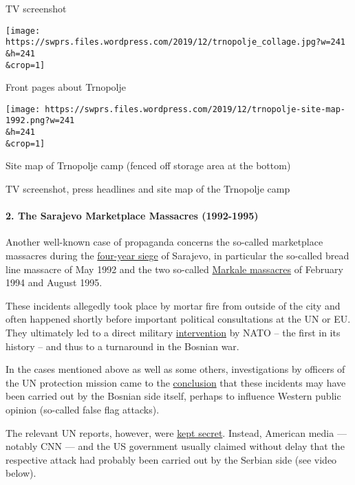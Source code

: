 TV screenshot

\href{https://swprs.files.wordpress.com/2019/12/trnopolje_collage.jpg}{}

\texttt{[image: https://swprs.files.wordpress.com/2019/12/trnopolje\_collage.jpg?w=241\\\&h=241\\\&crop=1]}

Front pages about Trnopolje

\href{https://swprs.files.wordpress.com/2019/12/trnopolje-site-map-1992.png}{}

\texttt{[image: https://swprs.files.wordpress.com/2019/12/trnopolje-site-map-1992.png?w=241\\\&h=241\\\&crop=1]}

Site map of Trnopolje camp (fenced off storage area at the bottom)

TV screenshot, press headlines and site map of the Trnopolje camp

\hypertarget{2-the-sarajevo-marketplace-massacres-1992-1995}{%
\paragraph{2. The Sarajevo Marketplace Massacres
(1992-1995)}\label{2-the-sarajevo-marketplace-massacres-1992-1995}}

Another well-known case of propaganda concerns the so-called marketplace
massacres during the
\href{https://en.wikipedia.org/wiki/Siege_of_Sarajevo}{four-year siege}
of Sarajevo, in particular the so-called bread line massacre of May 1992
and the two so-called
\href{https://en.wikipedia.org/wiki/Markale_massacres}{Markale
massacres} of February 1994 and August 1995.

These incidents allegedly took place by mortar fire from outside of the
city and often happened shortly before important political consultations
at the UN or EU. They ultimately led to a direct military
\href{https://en.wikipedia.org/wiki/Operation_Deliberate_Force}{intervention}
by NATO -- the first in its history -- and thus to a turnaround in the
Bosnian war.

In the cases mentioned above as well as some others, investigations by
officers of the UN protection mission came to the
\href{https://swprs.files.wordpress.com/2019/12/anatomy-of-a-massacre_david-binder_foreign-policy_1994.pdf}{conclusion}
that these incidents may have been carried out by the Bosnian side
itself, perhaps to influence Western public opinion (so-called false
flag attacks).

The relevant UN reports, however, were
\href{https://swprs.files.wordpress.com/2019/12/dpa_un-report-sarajevo_1996.pdf}{kept
secret}. Instead, American media --- notably CNN --- and the US
government usually claimed without delay that the respective attack had
probably been carried out by the Serbian side (see video below).

